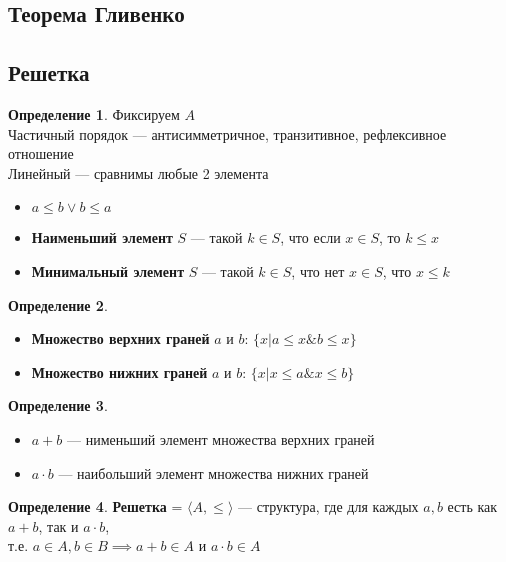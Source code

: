 \documentclass[english]{article}
\theoremstyle{plain}
\theoremstyle{remark}
\theoremstyle{definition}
\newtheorem*{definition}{Определение}
\begin{document}
\subsection{Теорема Гливенко}
\label{sec:org5e43036}
\subsection{Решетка}
\label{sec:orgfd8ccb0}
\begin{definition}
Фиксируем \(A\) \\
Частичный порядок --- антисимметричное, транзитивное, рефлексивное отношение \\
Линейный --- сравнимы любые 2 элемента \\
\begin{itemize}
\item \(a \le b \vee b \le a\)
\item \textbf{Наименьший элемент} \(S\) --- такой \(k \in S\), что если \(x \in S\), то \(k \le x\)
\item \textbf{Минимальный элемент} \(S\) --- такой \(k \in S\), что нет \(x \in S\), что \(x \le k\)
\end{itemize}
\label{orgd78d20e}
\end{definition}
\begin{definition}
\-
\begin{itemize}
\item \textbf{Множество верхних граней} \(a\) и \(b\): \(\{x \big| a \le x \& b \le x\}\)
\item \textbf{Множество нижних граней} \(a\) и \(b\): \(\{x \big| x \le a \& x \le b\}\)
\end{itemize}
\label{org2ed8116}
\end{definition}
\begin{definition}
\-
\begin{itemize}
\item \textbf{\(a + b\)} --- нименьший элемент множества верхних граней
\item \textbf{\(a \cdot b\)} --- наибольший элемент множества нижних граней
\end{itemize}
\label{org1bab69a}
\end{definition}
\begin{definition}
\textbf{Решетка} = \(\langle A, \le \rangle\) --- структура, где для каждых \(a, b\) есть как \(a + b\), так и \(a \cdot b\), \\
т.е. \(a \in A, b \in B \implies a + b \in A\) и \(a \cdot b \in A\)
\label{orgb1f6253}
\end{definition}
\end{document}
